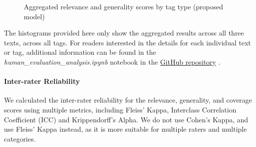 \begin{figure}[h]
    \centering
    \hfill
    \caption{Aggregated relevance and generality scores by tag type (proposed model)}
    \label{fig:tags_analysis_model_multiple_documents}
\end{figure}

The histograms provided here only show the aggregated results across all three texts, across all tags. For readers interested in the details for each individual text or tag, additional information can be found in the \textit{human\_evaluation\_analysis.ipynb} notebook in the \href{https://github.com/ivangermanov/openml-tags}{GitHub repository} \cite{germanov_topic_modeling_of_2024}.

\paragraph{Inter-rater Reliability}
We calculated the inter-rater reliability for the relevance, generality, and coverage scores using multiple metrics, including Fleiss' Kappa, Interclass Correlation Coefficient (ICC) and Krippendorff's Alpha. We do not use Cohen's Kappa, and use Fleiss' Kappa instead, as it is more suitable for multiple raters and multiple categories.

